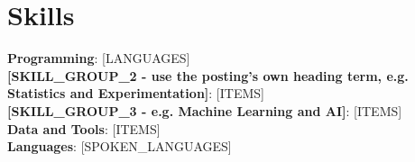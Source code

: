 \documentclass[a4paper,11pt]{article}
\newlength{\cvgap}\setlength{\cvgap}{0pt}
\begin{document}
\vspace{\cvgap}
\section{\textbf{Skills}}
 \begin{itemize}[leftmargin=0.15in, label={}]
    \small{\item{
     \textbf{Programming}{: [LANGUAGES]} \\
     \textbf{[SKILL_GROUP_2 - use the posting's own heading term, e.g. Statistics and Experimentation]}{: [ITEMS]} \\
     \textbf{[SKILL_GROUP_3 - e.g. Machine Learning and AI]}{: [ITEMS]} \\
     \textbf{Data and Tools}{: [ITEMS]} \\
     \textbf{Languages}: [SPOKEN_LANGUAGES]
    }}
 \end{itemize}
\end{document}
